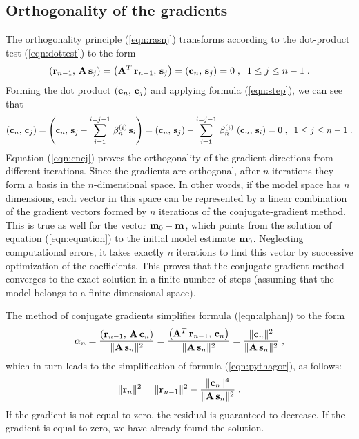 \subsection{Orthogonality of the gradients}
The orthogonality principle (\ref{eqn:rasnj}) transforms according to the
dot-product test (\ref{eqn:dottest}) to the form
\begin{equation}
\left({\bf r}_{n-1},\,{\bf A\,s}_{j}\right) = 
\left({\bf A}^T\,{\bf r}_{n-1},\,{\bf s}_{j}\right) =
\left({\bf c}_{n},\,{\bf s}_{j}\right) =
0\;,\;\;1 \leq j \leq n-1\;.
\label{eqn:csj}
\end{equation} 
Forming the dot product $\left({\bf c}_{n},\,{\bf c}_{j}\right)$ and
applying formula (\ref{eqn:step}), we can see that
\begin{equation}
\left({\bf c}_{n},\,{\bf c}_{j}\right) =
\left({\bf c}_{n},\,{\bf s}_{j} - 
\sum_{i=1}^{i=j-1}\,\beta_n^{(i)}\,{\bf s}_{i}\right) = 
\left({\bf c}_{n},\,{\bf s}_{j}\right) -
\sum_{i=1}^{i=j-1}\,\beta_n^{(i)}\,\left({\bf c}_{n},\,{\bf s}_{i}\right) =
0\;,\;\;1 \leq j \leq n-1\;.
\label{eqn:cncj}
\end{equation} 
Equation (\ref{eqn:cncj}) proves the orthogonality of the gradient directions from
different iterations. Since the gradients are orthogonal, after $n$
iterations they form a basis in the $n$-dimensional space. In other
words, if the model space has $n$ dimensions, each vector in this
space can be represented by a linear combination of the gradient
vectors formed by $n$ iterations of the conjugate-gradient
method. This is true as well for the vector ${\bf m}_0 - {\bf m}$, which
points from the solution of equation (\ref{eqn:equation}) to the initial
model estimate ${\bf m}_0$. Neglecting computational errors, it takes
exactly $n$ iterations to find this vector by successive optimization
of the coefficients. This proves that the
conjugate-gradient method converges to the exact solution in a
finite number of steps (assuming that the model belongs to a
finite-dimensional space).
\par
The method of conjugate gradients simplifies formula (\ref{eqn:alphan})
to the form
\begin{equation}
\alpha_n = {{\left({\bf r}_{n-1},\,{\bf A\,c}_n\right)} \over
{\|{\bf A\,s}_n\|^2}} =
{{\left({\bf A}^T\,{\bf r}_{n-1},\,{\bf c}_n\right)} \over
{\|{\bf A\,s}_n\|^2}} =
{{\|{\bf c}_n\|^2} \over {\|{\bf A\,s}_n\|^2}}\;,
\label{eqn:alphag}
\end{equation}
which in turn leads to the simplification of formula (\ref{eqn:pythagor}),
as follows:
\begin{equation}
\|{\bf r}_n\|^2 = \|{\bf r}_{n-1}\|^2 - 
{{\|{\bf c}_n\|^4}\over
{\|{\bf A\,s}_n\|^2}}\;.
\label{eqn:pythagog}
\end{equation}
If the gradient is not equal to zero, the residual is guaranteed to
decrease. If the gradient is equal to zero, we have already
found the solution.

